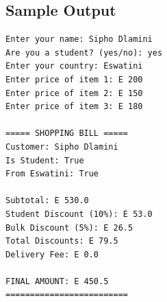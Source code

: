 \documentclass[a4paper,11pt]{article}
\theoremstyle{mytheor}
\begin{document}
\subsection*{Sample Output}

\begin{lstlisting}
Enter your name: Sipho Dlamini
Are you a student? (yes/no): yes
Enter your country: Eswatini
Enter price of item 1: E 200
Enter price of item 2: E 150
Enter price of item 3: E 180

===== SHOPPING BILL =====
Customer: Sipho Dlamini
Is Student: True
From Eswatini: True

Subtotal: E 530.0
Student Discount (10%): E 53.0
Bulk Discount (5%): E 26.5
Total Discounts: E 79.5
Delivery Fee: E 0.0

FINAL AMOUNT: E 450.5
=========================
\end{lstlisting}
 
\end{document}
